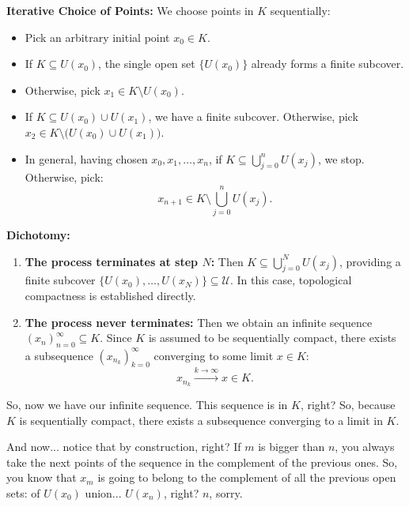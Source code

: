 \begin{proofWrapper}
\begin{content}
\textbf{Iterative Choice of Points:}
We choose points in $K$ sequentially:
\begin{itemize}
    \item Pick an arbitrary initial point $x_0 \in K$.
    \item If $K \subseteq U(x_0)$, the single open set $\{U(x_0)\}$ already forms a finite subcover.
    \item Otherwise, pick $x_1 \in K \setminus U(x_0)$.
    \item If $K \subseteq U(x_0) \cup U(x_1)$, we have a finite subcover. Otherwise, pick $x_2 \in K \setminus \bigl(U(x_0) \cup U(x_1)\bigr)$.
    \item In general, having chosen $x_0, x_1, \dots, x_n$, if $K \subseteq \bigcup_{j=0}^n U(x_j)$, we stop. Otherwise, pick:
    \begin{equation}\label{eq:inductive-step-seq}
    x_{n+1} \in K \setminus \bigcup_{j=0}^n U(x_j).
    \end{equation}
\end{itemize}

\textbf{Dichotomy:}
\begin{enumerate}[label=\textbf{(\arabic*)}]
    \item \textbf{The process terminates at step $N$:} Then $K \subseteq \bigcup_{j=0}^N U(x_j)$, providing a finite subcover $\{U(x_0), \dots, U(x_N)\} \subseteq \mathcal{U}$. In this case, topological compactness is established directly.
    \item \textbf{The process never terminates:} Then we obtain an infinite sequence $(x_n)_{n=0}^\infty \subseteq K$. Since $K$ is assumed to be sequentially compact, there exists a subsequence $(x_{n_k})_{k=0}^\infty$ converging to some limit $x \in K$:
    \[
    x_{n_k} \xrightarrow{k \to \infty} x \in K.
    \]
\end{enumerate}
\end{content}

\begin{speech}[00:04:47 - 00:06:15]
So, now we have our infinite sequence. This sequence is in $K$, right? So, because $K$ is sequentially compact, there exists a subsequence converging to a limit in $K$.

And now... notice that by construction, right? If $m$ is bigger than $n$,  you always take the next points of the sequence in the complement of the previous ones. So, you know that $x_m$ is going to belong to the complement of all the previous open sets:  of $U(x_0)$ union... $U(x_n)$, right? $n$, sorry.


\end{speech}
\end{proofWrapper}
